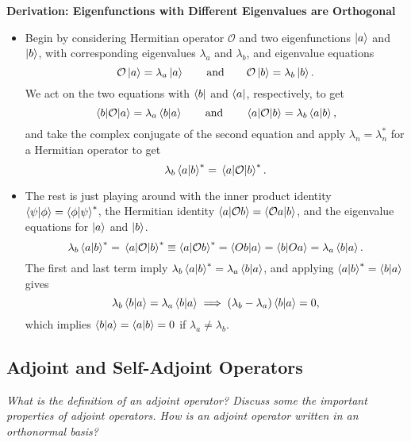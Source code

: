 \documentclass[11pt, a4paper]{article}
\newcommand{\eqtext}[1]{\qquad \text{#1} \qquad}
\newcommand{\Herm}{Hermitian\xspace}
\renewcommand{\O}{\mathcal{O}}  %
\newcommand{\p}{\psi}  %
\begin{document}
\textbf{Derivation: Eigenfunctions with Different Eigenvalues are Orthogonal}
\begin{itemize}

    \item Begin by considering \Herm operator $ \O $ and two eigenfunctions $ \ket{a} $ and $ \ket{b} $, with corresponding eigenvalues $ \lambda_{a} $ and $ \lambda_{b} $, and eigenvalue equations
	\begin{equation*}
		\O \ket{a} = \lambda_{a}\ket{a} \eqtext{and} \O \ket{b} = \lambda_{b}\ket{b}.
	\end{equation*}
	We act on the two equations with $ \bra{b} $ and $ \bra{a} $, respectively, to get
	\begin{equation*}
		\mel{b}{\O}{a} = \lambda_{a}\braket{b}{a} \eqtext{and} \mel{a}{\O}{b} = \lambda_{b}\braket{a}{b},
	\end{equation*}
	and take the complex conjugate of the second equation and apply $ \lambda_{n} = \lambda_{n}^{*} $ for a \Herm operator to get 
	\begin{equation*}
        \lambda_{b}\braket{a}{b}^{*} = \mel{a}{\O}{b}^{*}.
	\end{equation*}

	\item The rest is just playing around with the inner product identity $ \braket{\p}{\phi} = \braket{\phi}{\p}^{*} $, the \Herm identity $ \braket{a}{\O b} = \braket{\O a}{b} $, and the eigenvalue equations for $ \ket{a} $ and $ \ket{b} $. 
	\begin{equation*}
		\lambda_{b}\braket{a}{b}^{*} = \mel{a}{\O}{b}^{*} \equiv \braket{a}{\O b}^{*} = \braket{Ob}{a} = \braket{b}{Oa} = \lambda_{a}\braket{b}{a}.
	\end{equation*}
    The first and last term imply $ \lambda_{b}\braket{a}{b}^{*} = \lambda_{a}\braket{b}{a} $, and applying $ \braket{a}{b}^{*} = \braket{b}{a} $ gives
	\begin{equation*}
		\lambda_{b}\braket{b}{a} = \lambda_{a}\braket{b}{a} \implies (\lambda_{b} - \lambda_{a}) \braket{b}{a} = 0,
	\end{equation*}
    which implies $ \braket{b}{a} = \braket{a}{b} = 0 $ if $ \lambda_{a} \neq \lambda_{b} $.
\end{itemize}

\subsection{Adjoint and Self-Adjoint Operators}
\textit{What is the definition of an adjoint operator? Discuss some the important properties of adjoint operators. How is an adjoint operator written in an orthonormal basis?}
\end{document}
